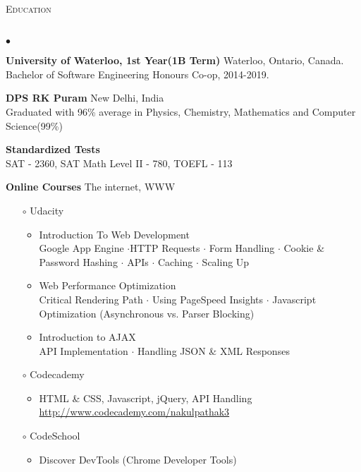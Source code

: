 \documentclass{article}
\newcommand{\lineunder}{\vspace*{-8pt} \\ \hspace*{-18pt} \hrulefill \\}
\newcommand{\header}[1]{{\hspace*{-15pt}\vspace*{6pt} \textsc{#1}} \vspace*{-6pt} \lineunder}
\newenvironment{achievements}{\begin{list}{$\bullet$}{\topsep 0pt \itemsep -1.5pt \leftmargin 5pt}}{\vspace*{4pt}\end{list}}
\begin{document}
\vspace{7pt}

\header{\normalsize Education}
\begin{achievements}
\item \textbf{University of Waterloo, 1st Year(1B Term)} Waterloo, Ontario, Canada. \\ Bachelor of Software Engineering Honours Co-op, 2014-2019. 
\item \textbf{DPS RK Puram} New Delhi, India \\ Graduated with 96\% average in Physics, Chemistry, Mathematics and Computer Science(99\%)
\item \textbf{Standardized Tests} \\ SAT - 2360, SAT Math Level II - 780, TOEFL - 113
\item \textbf{Online Courses} The internet, WWW
\vspace{-4pt}
\begin{itemize}\item[$\circ$] Udacity
	\begin{itemize}
	\vspace{-2pt}
	\item Introduction To Web Development
	\\  Google App Engine $\cdot$HTTP Requests  $\cdot$ Form Handling $\cdot$ Cookie \& Password Hashing $\cdot$ APIs $\cdot$ Caching $\cdot$ Scaling Up
	\vspace{-2pt}
	\item Web Performance Optimization
	\\ Critical Rendering Path $\cdot$ Using PageSpeed Insights $\cdot$ Javascript Optimization (Asynchronous vs. Parser Blocking)
	\vspace{-2pt}
	\item Introduction to AJAX
	\\ API Implementation $\cdot$ Handling JSON \& XML Responses 
	\end{itemize}
	\vspace{-3.5pt}
	\item[$\circ$] Codecademy
	\begin{itemize}
	\vspace{-2pt}
	\item HTML \& CSS, Javascript, jQuery, API Handling 
	\\ \url{http://www.codecademy.com/nakulpathak3}
	\end{itemize}
	\vspace{-3.5pt}
\item[$\circ$] CodeSchool
	\begin{itemize}
	\vspace{-2pt}
	\item Discover DevTools (Chrome Developer Tools)
	\end{itemize}
	\end{itemize}
\end{achievements}
\end{document}

